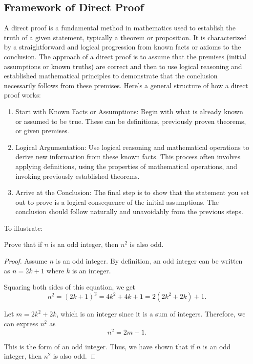 \documentclass[
	12pt, %
	fleqn, %
	a4paper, %
]{LegrandOrangeBook}
\begin{document}
	\subsection*{Framework of Direct Proof}
	A direct proof is a fundamental method in mathematics used to establish the truth of a
	given statement, typically a theorem or proposition. It is characterized by a straightforward
	and logical progression from known facts or axioms to the conclusion. The approach
	of a direct proof is to assume that the premises (initial assumptions or known truths)
	are correct and then to use logical reasoning and established mathematical principles to
	demonstrate that the conclusion necessarily follows from these premises. Here's a general
	structure of how a direct proof works:
	\begin{enumerate}
		\item Start with Known Facts or Assumptions: Begin with what is already known or
		assumed to be true. These can be definitions, previously proven theorems, or given
		premises.
		\item Logical Argumentation: Use logical reasoning and mathematical operations to derive
		new information from these known facts. This process often involves applying
		definitions, using the properties of mathematical operations, and invoking previously
		established theorems.
		\item Arrive at the Conclusion: The final step is to show that the statement you set out
		to prove is a logical consequence of the initial assumptions. The conclusion should
		follow naturally and unavoidably from the previous steps.
	\end{enumerate}
	To illustrate:
    \begin{example}
	
		Prove that if \( n \) is an odd integer, then \( n^2 \) is also odd.
	
    \end{example}

    \begin{proof}
		Assume \( n \) is an odd integer. By definition, an odd integer can be written as \( n = 2k + 1 \) where \( k \) is an integer.
		
		Squaring both sides of this equation, we get
		\[ n^2 = (2k + 1)^2 = 4k^2 + 4k + 1 = 2(2k^2 + 2k) + 1. \]
		
		Let \( m = 2k^2 + 2k \), which is an integer since it is a sum of integers. Therefore, we can express \( n^2 \) as
		\[ n^2 = 2m + 1. \]
		
		This is the form of an odd integer. Thus, we have shown that if \( n \) is an odd integer, then \( n^2 \) is also odd.
		\end{proof}
  
\end{document}
